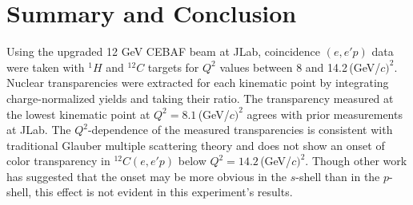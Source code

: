 \chapter{Summary and Conclusion}
Using the upgraded 12\,\,GeV CEBAF beam at JLab, coincidence $(e,e'p)$ data
were taken with $^{1}H$ and $^{12}C$ targets for $Q^2$ values between 8 and
14.2\,(GeV/$c)^2$.
Nuclear transparencies were extracted for each kinematic point by integrating
charge-normalized yields and taking their ratio.
The transparency measured at the lowest kinematic point at
$Q^2=8.1$\,(GeV/$c)^2$ agrees with prior measurements at JLab.
The $Q^2$-dependence of the measured transparencies is consistent with
traditional Glauber multiple scattering theory and does not show an onset of
color transparency in $^{12}C(e,e'p)$ below $Q^2=14.2$\,(GeV/$c)^2$.
Though other work has suggested that the onset may be more obvious in the
$s$-shell than in the $p$-shell, this effect is not evident in this
experiment's results.
